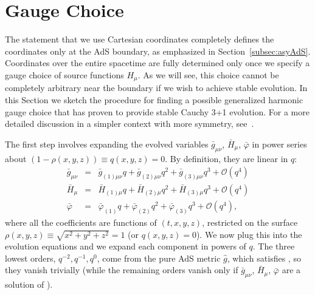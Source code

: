 \documentclass[12pt]{iopart} %
\begin{document}
\section{Gauge Choice}\label{sec:gauge_choice}

The statement that we use Cartesian coordinates completely defines the coordinates only at the AdS boundary, as emphasized in Section~\ref{subsec:asyAdS}. Coordinates over the entire spacetime are fully determined only once we specify a gauge choice of source functions $H_\mu$. As we will see, this choice cannot be completely arbitrary near the boundary if we wish to achieve stable evolution. In this Section we sketch the procedure for finding a possible generalized harmonic gauge choice that has proven to provide stable Cauchy 3+1 evolution.
For a more detailed discussion in a simpler context with more symmetry, see~\cite{Bantilan:2012vu}. 

The first step involves expanding the evolved variables $\bar{g}_{\mu \nu}$, $\bar{H}_{\mu}$, $\bar{\varphi}$ in power series about $(1-\rho(x,y,z)) \equiv q(x,y,z) = 0$. By definition, they are linear in $q$:
\begin{eqnarray}\label{eqn:qexp}
\bar{g}_{\mu \nu} &=& \bar{g}_{(1) \mu \nu} q + \bar{g}_{(2) \mu \nu} q^2 + \bar{g}_{(3) \mu \nu} q^3 + \mathcal{O}(q^4) \nonumber \\
\bar{H}_{\mu} &=& \bar{H}_{(1) \mu} q + \bar{H}_{(2) \mu} q^2 + \bar{H}_{(3) \mu} q^3 + \mathcal{O}(q^4) \nonumber \\
\bar{\varphi} &=& \bar{\varphi}_{(1)} q + \bar{\varphi}_{(2)} q^2 + \bar{\varphi}_{(3)} q^3 + \mathcal{O}(q^4),
\end{eqnarray}
where all the coefficients are functions of $(t,x,y,z)$, restricted on the surface $\rho(x,y,z)\equiv\sqrt{x^2+y^2+z^2}=1$ (or $q(x,y,z)=0$). We now plug this into the evolution equations  and we expand each component in powers of $q$. The three lowest orders, $q^{-2},q^{-1},q^0$, come from the pure AdS metric $\hat{g}$, which satisfies , so they vanish trivially (while the remaining orders vanish only if $\bar{g}_{\mu \nu}$, $\bar{H}_{\mu}$, $\bar{\varphi}$ are a solution of ).
\end{document}
